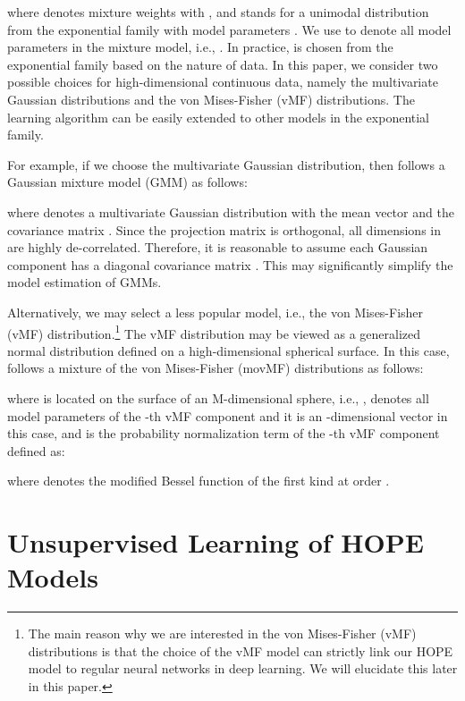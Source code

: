 \documentclass[11pt]{article}
\begin{document}
where  denotes mixture weights with , and  stands for a unimodal distribution from the exponential family with model parameters . We use  to denote all model parameters in the mixture model, i.e., .
In practice,  is chosen from the exponential family based on the nature of data. In this paper, we consider two possible choices for high-dimensional continuous data, namely the multivariate Gaussian distributions and the von Mises-Fisher (vMF) distributions. The learning algorithm can be easily extended to other models in the exponential family. 

For example, if we choose the multivariate Gaussian distribution, then  follows a Gaussian mixture model  (GMM) as follows:

where  denotes a multivariate Gaussian distribution with the mean vector  and the covariance matrix .  Since the projection matrix  is orthogonal, all dimensions in  are highly de-correlated. Therefore, it is reasonable to assume each Gaussian component has a diagonal covariance matrix . This may significantly simplify the model estimation of GMMs. 

Alternatively, we may select a less popular model, i.e., the von Mises-Fisher (vMF) distribution.\footnote{The main reason why we are interested in the von Mises-Fisher (vMF) distributions is that the choice of the vMF model can strictly link our HOPE model to regular neural networks in deep learning. We will elucidate this later in this paper. } The vMF distribution may be viewed as a generalized normal distribution defined  on a high-dimensional spherical surface. In this case,  follows a mixture of the von Mises-Fisher (movMF) distributions as follows:

where  is located on the surface of an M-dimensional sphere, i.e., , 
 denotes all model parameters of the -th vMF component and it is an -dimensional vector in this case, and
 is the probability normalization term of the -th vMF component defined as:

where  denotes the modified Bessel function of the first kind at order .

\section{Unsupervised Learning of HOPE Models}
\label{sec-upsupervised-MLE-HOPE}
\end{document}
